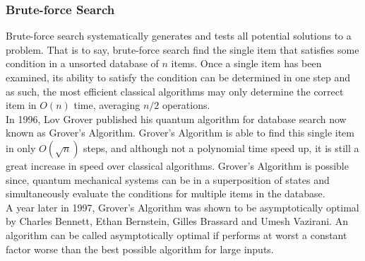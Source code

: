 \documentclass[reqno]{amsart}
\numberwithin{equation}{section}
\numberwithin{figure}{section}
\begin{document}
\subsubsection{Brute-force Search}
\begin{justify}
Brute-force search systematically generates and tests all potential solutions to a problem. That is to say, brute-force search find the single item that satisfies some condition in a unsorted database of $n$ items. Once a single item has been examined, its ability to satisfy the condition can be determined in one step and as such, the most efficient classical algorithms may only determine the correct item in $O(n)$ time, averaging $n/2$ operations. \\

In 1996, Lov Grover published his quantum algorithm for database search \cite{Grover1996} now known as Grover's Algorithm. Grover's Algorithm is able to find this single item in only $O(\sqrt{n})$ steps, and although not a polynomial time speed up, it is still a great increase in speed over classical algorithms. Grover's Algorithm is possible since, quantum mechanical systems can be in a superposition of states and simultaneously evaluate the conditions for multiple items in the database. \\

A year later in 1997, Grover's Algorithm was shown to be asymptotically optimal by Charles Bennett, Ethan Bernstein, Gilles Brassard and Umesh Vazirani. \cite{BennettBernsteinBrassardVazirani1997} An algorithm can be called asymptotically optimal if performs at worst a constant factor worse than the best possible algorithm for large inputs.
\end{justify}
\end{document}
